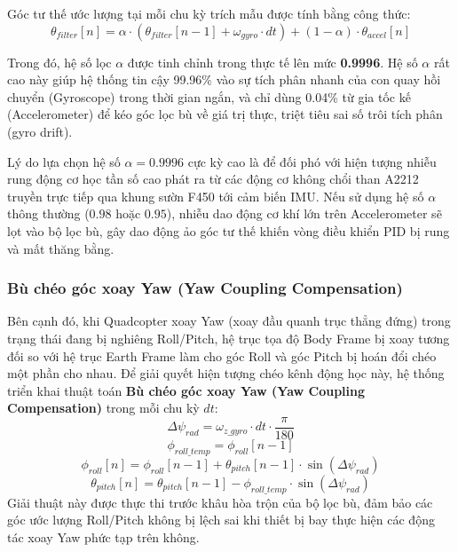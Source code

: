 Góc tư thế ước lượng tại mỗi chu kỳ trích mẫu được tính bằng công thức:
\begin{equation}
    \theta_{filter}[n] = \alpha \cdot (\theta_{filter}[n-1] + \omega_{gyro} \cdot dt) + (1 - \alpha) \cdot \theta_{accel}[n]
\end{equation}

Trong đó, hệ số lọc $\alpha$ được tinh chỉnh trong thực tế lên mức \textbf{0.9996}. Hệ số $\alpha$ rất cao này giúp hệ thống tin cậy 99.96\% vào sự tích phân nhanh của con quay hồi chuyển (Gyroscope) trong thời gian ngắn, và chỉ dùng 0.04\% từ gia tốc kế (Accelerometer) để kéo góc lọc bù về giá trị thực, triệt tiêu sai số trôi tích phân (gyro drift).

Lý do lựa chọn hệ số $\alpha = 0.9996$ cực kỳ cao là để đối phó với hiện tượng nhiễu rung động cơ học tần số cao phát ra từ các động cơ không chổi than A2212 truyền trực tiếp qua khung sườn F450 tới cảm biến IMU. Nếu sử dụng hệ số $\alpha$ thông thường ($0.98$ hoặc $0.95$), nhiễu dao động cơ khí lớn trên Accelerometer sẽ lọt vào bộ lọc bù, gây dao động ảo góc tư thế khiến vòng điều khiển PID bị rung và mất thăng bằng.

\subsubsection{Bù chéo góc xoay Yaw (Yaw Coupling Compensation)}

Bên cạnh đó, khi Quadcopter xoay Yaw (xoay đầu quanh trục thẳng đứng) trong trạng thái đang bị nghiêng Roll/Pitch, hệ trục tọa độ Body Frame bị xoay tương đối so với hệ trục Earth Frame làm cho góc Roll và góc Pitch bị hoán đổi chéo một phần cho nhau. Để giải quyết hiện tượng chéo kênh động học này, hệ thống triển khai thuật toán \textbf{Bù chéo góc xoay Yaw (Yaw Coupling Compensation)} trong mỗi chu kỳ $dt$:
\begin{equation}
    \Delta\psi_{rad} = \omega_{z\_gyro} \cdot dt \cdot \frac{\pi}{180}
\end{equation}
\begin{equation}
    \phi_{roll\_temp} = \phi_{roll}[n-1]
\end{equation}
\begin{equation}
    \phi_{roll}[n] = \phi_{roll}[n-1] + \theta_{pitch}[n-1] \cdot \sin(\Delta\psi_{rad})
\end{equation}
\begin{equation}
    \theta_{pitch}[n] = \theta_{pitch}[n-1] - \phi_{roll\_temp} \cdot \sin(\Delta\psi_{rad})
\end{equation}
Giải thuật này được thực thi trước khâu hòa trộn của bộ lọc bù, đảm bảo các góc ước lượng Roll/Pitch không bị lệch sai khi thiết bị bay thực hiện các động tác xoay Yaw phức tạp trên không.

